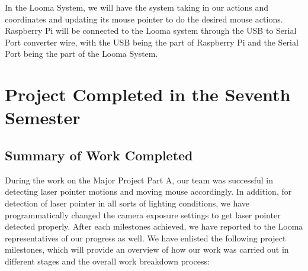 \documentclass[12pt, a4paper]{article}
\begin{document}
In the Looma System, we will have the system taking in our actions and coordinates and updating its mouse pointer to do the desired mouse actions. Raspberry Pi will be connected to the Looma system through the USB to Serial Port converter wire, with the USB being the part of Raspberry Pi and the Serial Port being the part of the Looma System.

\newpage
\section{Project Completed in the Seventh Semester}
\subsection{Summary of Work Completed}
During the work on the Major Project Part A, our team was successful in detecting laser pointer motions and moving mouse accordingly. In addition, for detection of laser pointer in all sorts of lighting conditions, we have programmatically changed the camera exposure settings to get laser pointer detected properly. After each milestones achieved, we have reported to the Looma representatives of our progress as well. We have enlisted the following project milestones, which will provide an overview of how our work was carried out in different stages and the overall work breakdown process:
\end{document}
